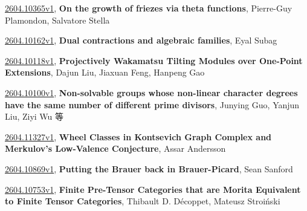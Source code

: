 \documentclass[9pt, a4paper]{article}
\theoremstyle{plain}
\theoremstyle{definition}
\theoremstyle{remark}
\newcommand{\arxiv}[3]{\href{https://arxiv.org/abs/#1}{#1}, \textbf{\textcolor{arxivblue}{#2}}, #3}
\begin{document}
\arxiv{2604.10365v1}{On the growth of friezes via theta functions}{Pierre-Guy Plamondon, Salvatore Stella}

\arxiv{2604.10162v1}{Dual contractions and algebraic families}{Eyal Subag}

\arxiv{2604.10118v1}{Projectively Wakamatsu Tilting Modules over One-Point Extensions}{Dajun Liu, Jiaxuan Feng, Hanpeng Gao}

\arxiv{2604.10100v1}{Non-solvable groups whose non-linear character degrees have the same number of different prime divisors}{Junying Guo, Yanjun Liu, Ziyi Wu 等}

\arxiv{2604.11327v1}{Wheel Classes in Kontsevich Graph Complex and Merkulov's Low-Valence Conjecture}{Assar Andersson}

\arxiv{2604.10869v1}{Putting the Brauer back in Brauer-Picard}{Sean Sanford}

\arxiv{2604.10753v1}{Finite Pre-Tensor Categories that are Morita Equivalent to Finite Tensor Categories}{Thibault D. Décoppet, Mateusz Stroiński}

\end{document}
